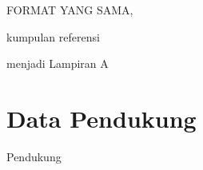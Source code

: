 \documentclass[a4paper,12pt]{book}
\begin{document}
FORMAT YANG SAMA,

kumpulan referensi

\appendix %
menjadi Lampiran A

\chapter{Data Pendukung} %
Pendukung
\newpage
\pagestyle{empty}
\vspace*{7cm}
\centering
{}
  \par   
      \vfill 
     
\end{document}
